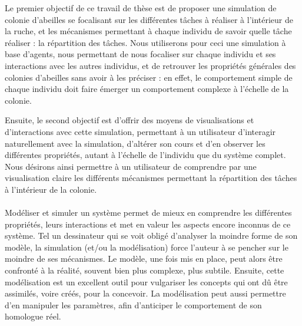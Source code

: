 	Le premier objectif de ce travail de thèse est de proposer une simulation de colonie d'abeilles se focalisant sur les différentes tâches à réaliser à l'intérieur de la ruche, et les mécanismes permettant à chaque individu de savoir quelle tâche réaliser : la répartition des tâches. Nous utiliserons pour ceci une simulation à base d'agents, nous permettant de nous focaliser sur chaque individu et ses interactions avec les autres individus, et de retrouver les propriétés générales des colonies d'abeilles sans avoir à les préciser : en effet, le comportement simple de chaque individu doit faire émerger un comportement complexe à l'échelle de la colonie. 
	
	Ensuite, le second objectif est d'offrir des moyens de visualisations et d'interactions avec cette simulation, permettant à un utilisateur d'interagir naturellement avec la simulation, d'altérer son cours et d'en observer les différentes propriétés, autant à l'échelle de l'individu que du système complet. Nous désirons ainsi permettre à un utilisateur de comprendre par une visualisation claire les différents mécanismes permettant la répartition des tâches à l'intérieur de la colonie.
	
	\paragraph{}		
		Modéliser et simuler un système permet de mieux en comprendre les différentes propriétés, leurs interactions et met en valeur les aspects encore inconnus de ce système. Tel un dessinateur qui se voit obligé d'analyser la moindre forme de son modèle, la simulation (et/ou la modélisation) force l'auteur à se pencher sur le moindre de ses mécanismes. Le modèle, une fois mis en place, peut alors être confronté à la réalité, souvent bien plus complexe, plus subtile. Ensuite, cette modélisation est un excellent outil pour vulgariser les concepts qui ont dû être assimilés, voire créés, pour la concevoir. La modélisation peut aussi permettre d'en manipuler les paramètres, afin d'anticiper le comportement de son homologue réel.
		
	
